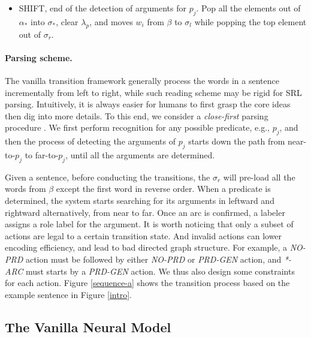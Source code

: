 \documentclass[letterpaper]{article} \usepackage{aaai21}  \usepackage{times}  \usepackage{helvet} \usepackage{courier}  \usepackage[hyphens]{url}  \usepackage{graphicx} \urlstyle{rm} \def\UrlFont{\rm}  \usepackage{natbib}  \usepackage{caption}
\begin{document}
\begin{CJK}{UTF8}{gbsn}
\begin{itemize}
    \item SHIFT, end of the detection of arguments for $p_j$. Pop all the elements out of $\alpha_{*}$ into $\sigma_{*}$, clear $\lambda_p$, and moves $w_i$ from $\beta$ to $\sigma_l$ while popping the top element out of $\sigma_r$.

\end{itemize}


\vspace{-10pt}
\paragraph{Parsing scheme.}
The vanilla transition framework generally process the words in a sentence incrementally from left to right, while such reading scheme may be rigid for SRL parsing.
Intuitively, it is always easier for humans to first grasp the core ideas then dig into more details.
To this end, we consider a \emph{close-first} parsing procedure \cite{goldberg-elhadad-2010-efficient,cai-lam-2019-core,kurita-sogaard-2019-multi}.
We first perform recognition for any possible predicate, e.g., $p_j$, and then the process of detecting the arguments of $p_j$ starts down the path from near-to-$p_j$ to far-to-$p_j$, until all the arguments are determined.



Given a sentence, before conducting the transitions, the $\sigma_r$ will pre-load all the words from $\beta$ except the first word in reverse order.
When a predicate is determined, the system starts searching for its arguments in leftward and rightward alternatively, from near to far.
Once an arc is confirmed, a labeler assigns a role label for the argument.
It is worth noticing that only a subset of actions are legal to a certain transition state.
And invalid actions can lower encoding efficiency, and lead to bad directed graph structure.
For example, a \emph{NO-PRD} action must be followed by either \emph{NO-PRD} or \emph{PRD-GEN} action, and \emph{*-ARC} must starts by a \emph{PRD-GEN} action.
We thus also design some constraints for each action.
Figure \ref{sequence-a} shows the transition process based on the example sentence in Figure \ref{intro}.






\subsection{The Vanilla Neural Model}\label{vanilla model}








\end{CJK}
\end{document}
